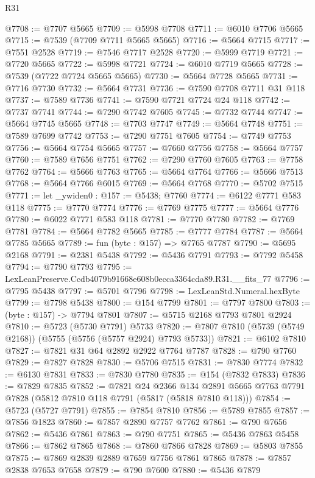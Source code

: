 \begin{lexlean}{R31}
\begin{coremodule}
@7708 := @7707 @5665
@7709 := @5998 @7708
@7711 := @6010 @7706 @5665
@7715 := @7539 (@7709 @7711 @5665 @5665)
@7716 := @5664 @7715
@7717 := @7551 @2528
@7719 := @7546 @7717 @2528
@7720 := @5999 @7719
@7721 := @7720 @5665
@7722 := @5998 @7721
@7724 := @6010 @7719 @5665
@7728 := @7539 (@7722 @7724 @5665 @5665)
@7730 := @5664 @7728 @5665
@7731 := @7716 @7730
@7732 := @5664 @7731
@7736 := @7590 @7708 @7711 @31 @118
@7737 := @7589 @7736
@7741 := @7590 @7721 @7724 @24 @118
@7742 := @7737 @7741
@7744 := @7290 @7742 @7605
@7745 := @7732 @7744
@7747 := @5664 @7745 @5665
@7748 := @7703 @7747
@7749 := @5664 @7748
@7751 := @7589 @7699 @7742
@7753 := @7290 @7751 @7605
@7754 := @7749 @7753
@7756 := @5664 @7754 @5665
@7757 := @7660 @7756
@7758 := @5664 @7757
@7760 := @7589 @7656 @7751
@7762 := @7290 @7760 @7605
@7763 := @7758 @7762
@7764 := @5666 @7763
@7765 := @5664 @7764
@7766 := @5666 @7513
@7768 := @5664 @7766 @6015
@7769 := @5664 @7768
@7770 := @5702 @7515
@7771 := let _ywiden0 : @157 := @5438; @7760
@7774 := @6122 @7771 @583 @118
@7775 := @7770 @7774
@7776 := @7769 @7775
@7777 := @5664 @7776
@7780 := @6022 @7771 @583 @118
@7781 := @7770 @7780
@7782 := @7769 @7781
@7784 := @5664 @7782 @5665
@7785 := @7777 @7784
@7787 := @5664 @7785 @5665
@7789 := fun (byte : @157) => @7765 @7787
@7790 := @5695 @2168
@7791 := @2381 @5438
@7792 := @5436 @7791
@7793 := @7792 @5458
@7794 := @7790 @7793
@7795 := LexLeanPreserve.Ccdb4079b91668e608b0ecca3364cda89.R31.__fits_77
@7796 := @7795 @5438
@7797 := @5701 @7796
@7798 := LexLeanStd.Numeral.hexByte
@7799 := @7798 @5438
@7800 := @154 @7799
@7801 := @7797 @7800
@7803 := (byte : @157) -> @7794 @7801
@7807 := @5715 @2168 @7793 @7801 @2924
@7810 := @5723 (@5730 @7791) @5733
@7820 := @7807 @7810 (@5739 (@5749 @2168)) (@5755 (@5756 (@5757 @2924) @7793 @5733))
@7821 := @6102 @7810
@7827 := @7821 @31 @64 @2892 @2922 @7764 @7787
@7828 := @790 @7760
@7829 := @7827 @7828
@7830 := @5706 @7515
@7831 := @7830 @7774
@7832 := @6130 @7831
@7833 := @7830 @7780
@7835 := @154 (@7832 @7833)
@7836 := @7829 @7835
@7852 := @7821
    @24
    @2366
    @134
    @2891
    @5665
    @7763
    @7791
    @7828
    (@5812 @7810 @118 @7791 (@5817 (@5818 @7810 @118)))
@7854 := @5723 (@5727 @7791)
@7855 := @7854 @7810
@7856 := @5789 @7855
@7857 := @7856 @1823
@7860 := @7857 @2890 @7757 @7762
@7861 := @790 @7656
@7862 := @5436 @7861
@7863 := @790 @7751
@7865 := @5436 @7863 @5458
@7866 := @7862 @7865
@7868 := @7860 @7866 @7828
@7869 := @5803 @7855
@7875 := @7869 @2839 @2889 @7659 @7756 @7861 @7865
@7878 := @7857 @2838 @7653 @7658
@7879 := @790 @7600
@7880 := @5436 @7879

\end{coremodule}
\end{lexlean}

